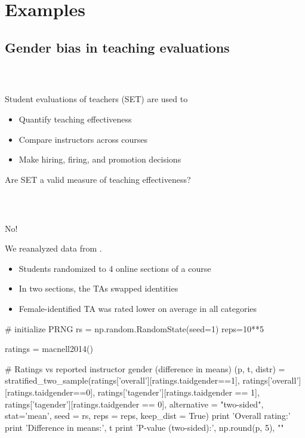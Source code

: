 \documentclass{beamer}
\begin{document}
\section[Examples]{Examples}
\subsection[Teaching evaluations]{Gender bias in teaching evaluations}


\frame
{
  \frametitle{ ~}
 \begin{center}
 \Large{ Student evaluations of teachers (SET) are used to} \\
  \begin{itemize}
  \item Quantify teaching effectiveness
  \item Compare instructors across courses
  \item Make hiring, firing, and promotion decisions  
  \end{itemize}
  \vfill
Are SET a valid measure of teaching effectiveness?
\end{center}
}


\frame
{
  \frametitle{ ~}
  \begin{center}
  \Huge{No!}
  \end{center}
\Large

We reanalyzed data from \cite{macnell2014whats}.
\begin{center}
\begin{itemize}
\itemsep 15pt
\item Students randomized to 4 online sections of a course
\item In two sections, the TAs swapped identities
\item Female-identified TA was rated lower on average in all categories
\end{itemize}
\end{center}
}




\begin{frame}[fragile]
\begin{python}
# initialize PRNG
rs = np.random.RandomState(seed=1)
reps=10**5

ratings = macnell2014()

# Ratings vs reported instructor gender (difference in means)
(p, t, distr) = stratified_two_sample(ratings['overall'][ratings.taidgender==1],                                      ratings['overall'][ratings.taidgender==0], 
                      ratings['tagender'][ratings.taidgender == 1], 
                      ratings['tagender'][ratings.taidgender == 0],
                      alternative = "two-sided", stat='mean', seed = rs, 
                      reps = reps, keep_dist = True)
print 'Overall rating:'
print 'Difference in means:', t
print 'P-value (two-sided):', np.round(p, 5), "\n"\end{python}
\end{frame}
\end{document}
